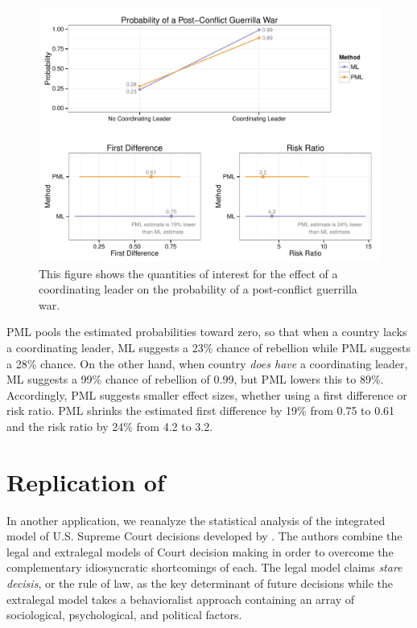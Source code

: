 \documentclass[12pt]{article}
\begin{document}
\begin{figure}[H]
\begin{center}
\includegraphics[width = \textwidth]{figs/weisiger-qis.pdf}
\caption{This figure shows the quantities of interest for the effect of a coordinating leader on the probability of a post-conflict guerrilla war.}\label{fig:weisiger-qis}
\end{center}
\end{figure}

PML pools the estimated probabilities toward zero, so that when a country lacks a coordinating leader, ML suggests a 23\% chance of rebellion while PML suggests a 28\% chance. 
On the other hand, when country \textit{does have} a coordinating leader, ML suggests a 99\% chance of rebellion of 0.99, but PML lowers this to 89\%. 
Accordingly, PML suggests smaller effect sizes, whether using a first difference or risk ratio. 
PML shrinks the estimated first difference by 19\% from 0.75 to 0.61 and the risk ratio by 24\% from 4.2 to 3.2.

\section*{Replication of \cite{GeorgeEpstein1992}}

In another application, we reanalyze the statistical analysis of the integrated model of U.S. Supreme Court decisions developed by \cite{GeorgeEpstein1992}. 
The authors combine the legal and extralegal models of  Court decision making in order to overcome the complementary idiosyncratic shortcomings of each. 
The legal model claims \emph{stare decisis}, or the rule of law, as the key determinant of future decisions while the extralegal model takes a behavioralist approach containing an array of sociological, psychological, and political factors. 
\end{document}
